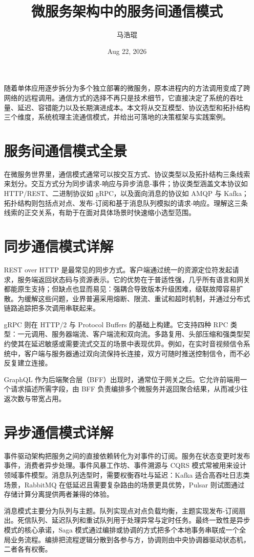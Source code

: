 \title{微服务架构中的服务间通信模式}
\author{马浩琨}
\date{Aug 22, 2026}
\maketitle
随着单体应用逐步拆分为多个独立部署的微服务，原本进程内的方法调用变成了跨网络的远程调用。通信方式的选择不再只是技术细节，它直接决定了系统的吞吐量、延迟、容错能力以及长期演进成本。本文将从交互模型、协议选型和拓扑结构三个维度，系统梳理主流通信模式，并给出可落地的决策框架与实践案例。\par
\chapter{服务间通信模式全景}
在微服务世界里，通信模式通常可以按交互方式、协议类型以及拓扑结构三条线索来划分。交互方式分为同步请求-响应与异步消息-事件；协议类型涵盖文本协议如 HTTP/REST、二进制协议如 gRPC，以及面向消息的协议如 AMQP 与 Kafka；拓扑结构则包括点对点、发布-订阅和基于消息队列模拟的请求-响应。理解这三条线索的正交关系，有助于在面对具体场景时快速缩小选型范围。\par
\chapter{同步通信模式详解}
REST over HTTP 是最常见的同步方式。客户端通过统一的资源定位符发起请求，服务端返回状态码与资源表示。它的优势在于普适性强，几乎所有语言和网关都能原生支持；但缺点也显而易见：强耦合导致版本升级困难，级联故障容易扩散。为缓解这些问题，业界普遍采用熔断、限流、重试和超时机制，并通过分布式链路追踪把多次调用串联起来。\par
gRPC 则在 HTTP/2 与 Protocol Buffers 的基础上构建。它支持四种 RPC 类型：一元调用、服务器端流、客户端流和双向流。多路复用、头部压缩和强类型契约使其在延迟敏感或需要流式交互的场景中表现优异。例如，在实时音视频信令系统中，客户端与服务器通过双向流保持长连接，双方可随时推送控制信令，而不必反复建立连接。\par
GraphQL 作为后端聚合层（BFF）出现时，通常位于网关之后。它允许前端用一个请求描述所需字段，由 BFF 负责编排多个微服务并返回聚合结果，从而减少往返次数与带宽占用。\par
\chapter{异步通信模式详解}
事件驱动架构把服务之间的直接依赖转化为对事件的订阅。服务在状态变更时发布事件，消费者异步处理。事件风暴工作坊、事件溯源与 CQRS 模式常被用来设计领域事件模型。消息队列选型时，需要权衡吞吐与延迟：Kafka 适合高吞吐日志类场景，RabbitMQ 在低延迟且需要复杂路由的场景更具优势，Pulsar 则试图通过存储计算分离提供两者兼得的体验。\par
消息模式主要分为队列与主题。队列实现点对点负载均衡，主题实现发布-订阅扇出。死信队列、延迟队列和重试队列用于处理异常与定时任务。最终一致性是异步模式的核心承诺，Saga 模式通过编排或协调的方式把多个本地事务串联成一个全局业务流程。编排把流程逻辑分散到各参与方，协调则由中央协调器驱动状态机，二者各有权衡。\par
